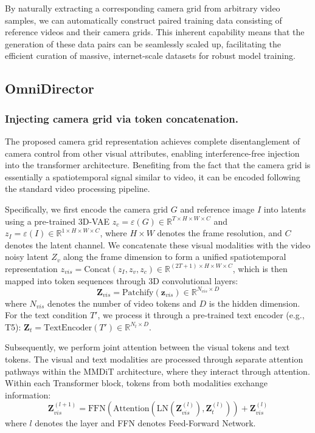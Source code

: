 \documentclass[letterpaper]{article} %
\begin{document}
By naturally extracting a corresponding camera grid from arbitrary video samples, we can automatically construct paired training data consisting of reference videos and their camera grids. This inherent capability means that the generation of these data pairs can be seamlessly scaled up, facilitating the efficient curation of massive, internet-scale datasets for robust model training.


\subsection{OmniDirector}

\subsubsection{Injecting camera grid via token concatenation.}
The proposed camera grid representation achieves complete disentanglement of camera control from other visual attributes, enabling interference-free injection into the transformer architecture. Benefiting from the fact that the camera grid is essentially a spatiotemporal signal similar to video, it can be encoded following the standard video processing pipeline. 

Specifically, we first encode the camera grid $G$ and reference image $I$ into latents using a pre-trained 3D-VAE $z_c = \varepsilon(G) \in \mathbb{R}^{T \times H \times W \times C}$ and $z_I = \varepsilon(I) \in \mathbb{R}^{1 \times H \times W \times C} $, where $H \times W$ denotes the frame resolution, and $C$ denotes the latent channel. We concatenate these visual modalities with the video noisy latent $Z_v$ along the frame dimension to form a unified spatiotemporal representation $z_{vis}=\text{Concat}(z_I, z_v, z_c) \in \mathbb{R}^{(2T+1) \times H \times W \times C}$, which is then mapped into token sequences through 3D convolutional layers:
\begin{equation}
\mathbf{Z}_{vis} = \text{Patchify}(\mathbf{z}_{vis}) \in \mathbb{R}^{N_{vis} \times D}
\end{equation}
where $N_{vis}$ 
denotes the number of video tokens and $D$ is the hidden dimension. 
For the text condition $T'$, we process it through a pre-trained text encoder (e.g., T5): $\mathbf{Z}_t = \text{TextEncoder}(T') \in \mathbb{R}^{N_t \times D}$. 

Subsequently, we perform joint attention between the visual tokens and text tokens. The visual and text modalities are processed through separate attention pathways within the MMDiT architecture, where they interact through attention. Within each Transformer block, tokens from both modalities exchange information:
\begin{equation}
\mathbf{Z}_{vis}^{(l+1)} = \text{FFN}(\text{Attention}(\text{LN}(\mathbf{Z}_{vis}^{(l)}), \mathbf{Z}_t^{(l)})) + \mathbf{Z}_{vis}^{(l)}
\end{equation}
where $l$ denotes the layer and FFN denotes Feed-Forward Network. 
\end{document}
